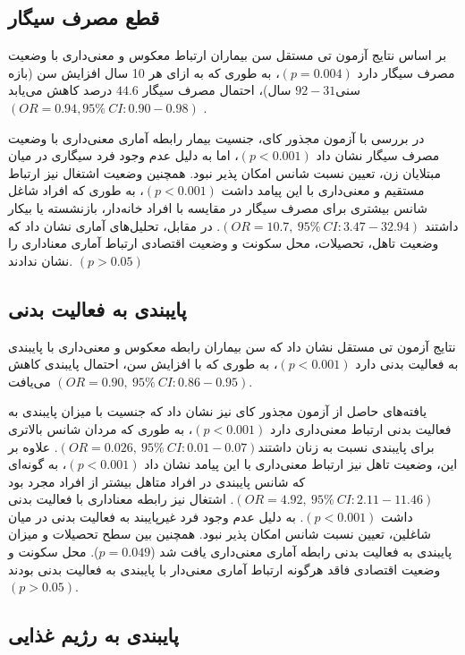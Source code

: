 \subsection*{\textbf{قطع مصرف سیگار}}


بر اساس نتایج آزمون تی مستقل سن بیماران ارتباط معکوس و معنی‌داری با وضعیت مصرف سیگار دارد $(p=0.004)$، به طوری که به ازای هر 10 سال افزایش سن (بازه سنی$ 92-31$ سال)، احتمال مصرف سیگار $44.6$ درصد کاهش می‌یابد $(OR=0.94, 95\% \ CI:0.90-0.98)$ .

در بررسی با آزمون مجذور کای، جنسیت بیمار رابطه آماری معنی‌داری با وضعیت مصرف سیگار نشان داد $(p<0.001)$، اما به دلیل عدم وجود فرد سیگاری در میان مبتلایان زن، تعیین نسبت شانس امکان پذیر نبود. همچنین وضعیت اشتغال نیز ارتباط مستقیم و معنی‌داری با این پیامد داشت $(p<0.001)$، به طوری که افراد شاغل شانس بیشتری برای مصرف سیگار در مقایسه با افراد خانه‌دار، بازنشسته یا بیکار داشتند $(OR=10.7, \ 95\% \ CI:3.47-32.94)$. در مقابل، تحلیل‌های آماری نشان داد که وضعیت تاهل، تحصیلات، محل سکونت و وضعیت اقتصادی ارتباط آماری معناداری را نشان ندادند. $(p>0.05)$

\subsection*{\textbf{پایبندی به فعالیت بدنی}}


نتایج آزمون تی مستقل نشان داد که سن بیماران رابطه معکوس و معنی‌داری با پایبندی به فعالیت بدنی دارد $(p<0.001)$، به طوری که با افزایش سن، احتمال پایبندی کاهش می‌یافت $(OR=0.90, \ 95\% \ CI:0.86-0.95)$.

یافته‌های حاصل از آزمون مجذور کای نیز نشان داد که جنسیت با میزان پایبندی به فعالیت بدنی ارتباط معنی‌داری دارد $(p<0.001)$، به طوری که مردان شانس بالاتری برای پایبندی نسبت به زنان داشتند$(OR=0.026, \ 95\% \ CI:0.01-0.07)$. علاوه بر این، وضعیت تاهل نیز ارتباط معنی‌داری با این پیامد نشان داد $(p<0.001)$، به گونه‌ای که شانس پایبندی در افراد متاهل بیشتر از افراد مجرد بود $(OR=4.92, \ 95\% \ CI:2.11-11.46)$. اشتغال نیز رابطه معناداری با فعالیت بدنی داشت $(p<0.001)$. به دلیل عدم وجود فرد غیرپایبند به فعالیت بدنی در میان شاغلین، تعیین نسبت شانس امکان پذیر نبود. همچنین بین سطح تحصیلات و میزان پایبندی به فعالیت بدنی رابطه آماری معنی‌داری یافت شد (\(p=0.049\)). محل سکونت و وضعیت اقتصادی فاقد هرگونه ارتباط آماری معنی‌دار با پایبندی به فعالیت بدنی بودند $(p>0.05)$.

\subsection*{\textbf{پایبندی به رژیم غذایی}}


